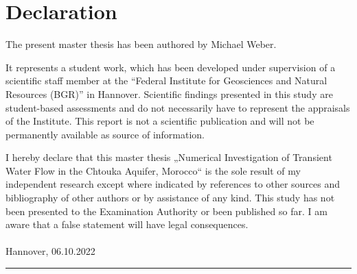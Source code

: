 \thispagestyle{plain}
\section*{Declaration}
The present master thesis has been authored by Michael Weber.

It represents a student work, which has been developed under supervision of a scientific staff member at the “Federal Institute for Geosciences and Natural Resources (BGR)” in Hannover. Scientific findings presented in this study are student-based assessments and do not necessarily have to represent the appraisals of the Institute. This report is not a scientific publication and will not be permanently available as source of information.

I hereby declare that this master thesis „Numerical Investigation of Transient Water Flow in the Chtouka Aquifer, Morocco“ is the sole result of my independent research except where indicated by references to other sources and bibliography of other authors or by assistance of any kind.
This study has not been presented to the Examination Authority or been published so far. I am aware that a false statement will have legal consequences.\\
\\



Hannover, 06.10.2022 \hfill\rule{4cm}{0.4pt} \\